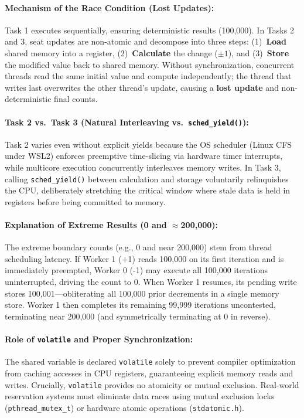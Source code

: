 \documentclass[a4paper,10pt]{article}
\begin{document}
\paragraph{Mechanism of the Race Condition (Lost Updates):}
Task 1 executes sequentially, ensuring deterministic results (100,000). In Tasks 2 and 3, seat updates are non-atomic and decompose into three steps: (1)~\textbf{Load} shared memory into a register, (2)~\textbf{Calculate} the change ($\pm 1$), and (3)~\textbf{Store} the modified value back to shared memory. Without synchronization, concurrent threads read the same initial value and compute independently; the thread that writes last overwrites the other thread's update, causing a \textbf{lost update} and non-deterministic final counts.

\paragraph{Task 2 vs.\ Task 3 (Natural Interleaving vs.\ \texttt{sched\_yield()}):}
Task 2 varies even without explicit yields because the OS scheduler (Linux CFS under WSL2) enforces preemptive time-slicing via hardware timer interrupts, while multicore execution concurrently interleaves memory writes. In Task 3, calling \texttt{sched\_yield()} between calculation and storage voluntarily relinquishes the CPU, deliberately stretching the critical window where stale data is held in registers before being committed to memory.

\paragraph{Explanation of Extreme Results (0 and $\approx$200,000):}
The extreme boundary counts (e.g., 0 and near 200,000) stem from thread scheduling latency. If Worker 1 (+1) reads 100,000 on its first iteration and is immediately preempted, Worker 0 (-1) may execute all 100,000 iterations uninterrupted, driving the count to 0. When Worker 1 resumes, its pending write stores 100,001—obliterating all 100,000 prior decrements in a single memory store. Worker 1 then completes its remaining 99,999 iterations uncontested, terminating near 200,000 (and symmetrically terminating at 0 in reverse).

\paragraph{Role of \texttt{volatile} and Proper Synchronization:}
The shared variable is declared \texttt{volatile} solely to prevent compiler optimization from caching accesses in CPU registers, guaranteeing explicit memory reads and writes. Crucially, \texttt{volatile} provides no atomicity or mutual exclusion. Real-world reservation systems must eliminate data races using mutual exclusion locks (\texttt{pthread\_mutex\_t}) or hardware atomic operations (\texttt{stdatomic.h}).
\end{document}
